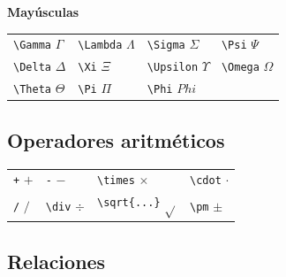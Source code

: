 \documentclass[
  a4paper,
]{scrreport}
\theoremstyle{definition}
\theoremstyle{remark}
\begin{document}
\textbf{Mayúsculas}

\begin{longtable}[]{@{}
  >{\raggedright\arraybackslash}p{}
  >{\raggedright\arraybackslash}p{}
  >{\raggedright\arraybackslash}p{}
  >{\raggedright\arraybackslash}p{}@{}}
\toprule\noalign{}
\endhead
\bottomrule\noalign{}
\endlastfoot
\texttt{\textbackslash{}Gamma} \(\Gamma\) &
\texttt{\textbackslash{}Lambda} \(\Lambda\) &
\texttt{\textbackslash{}Sigma} \(\Sigma\) & \texttt{\textbackslash{}Psi}
\(\Psi\) \\
\texttt{\textbackslash{}Delta} \(\Delta\) & \texttt{\textbackslash{}Xi}
\(\Xi\) & \texttt{\textbackslash{}Upsilon} \(\Upsilon\) &
\texttt{\textbackslash{}Omega} \(\Omega\) \\
\texttt{\textbackslash{}Theta} \(\Theta\) & \texttt{\textbackslash{}Pi}
\(\Pi\) & \texttt{\textbackslash{}Phi} \(Phi\) & \\
\end{longtable}

\subsection{Operadores aritméticos}\label{operadores-aritmuxe9ticos}

\begin{longtable}[]{@{}llll@{}}
\toprule\noalign{}
\endhead
\bottomrule\noalign{}
\endlastfoot
\texttt{+} \(+\) & \texttt{-} \(-\) & \texttt{\textbackslash{}times}
\(\times\) & \texttt{\textbackslash{}cdot} \(\cdot\) \\
\texttt{/} \(/\) & \texttt{\textbackslash{}div} \(\div\) &
\texttt{\textbackslash{}sqrt\{...\}} \(\sqrt{}\) &
\texttt{\textbackslash{}pm} \(\pm\) \\
\end{longtable}

\subsection{Relaciones}\label{relaciones}
\end{document}
